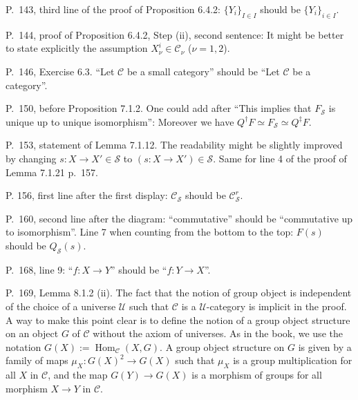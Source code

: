 \documentclass[12pt]{article}
\theoremstyle{remark}
\theoremstyle{definition}
\newcommand{\cc}{\mathcal}
\newcommand{\C}{\mathcal C}
\newcommand{\SSS}{\mathcal S}
\newcommand{\U}{\mathcal U}
\DeclareMathOperator{\Hom}{Hom}%
\begin{document}
\noindent P.~143, third line of the proof of Proposition 6.4.2: $\{Y_i\}_{I\in I}$ should be $\{Y_i\}_{i\in I}$. 

\noindent P.~144, proof of Proposition 6.4.2, Step (ii), second sentence: It might be better to state explicitly the assumption $X_\nu^i\in\C_\nu$ ($\nu=1,2$). 

\noindent P.~146, Exercise 6.3. ``Let $\C$ be a small category'' should be ``Let $\C$ be a category''. 

\noindent P.~150, before Proposition 7.1.2. One could add after ``This implies that $F_{\SSS}$ is unique up to unique isomorphism'': Moreover we have $Q^\dagger F\simeq F_{\SSS}\simeq Q^\ddagger F$. 

\noindent P.~153, statement of Lemma 7.1.12. The readability might be slightly improved by changing $s:X\to X'\in\mathcal S$ to $(s:X\to X')\in\mathcal S$. Same for line 4 of the proof of Lemma 7.1.21 p.~157.

\noindent P. 156, first line after the first display: $\C_{\cc S}$ should be $\C_{\cc S}^r$. 

\noindent P.~160, second line after the diagram: ``commutative'' should be ``commutative up to isomorphism''. Line 7 when counting from the bottom to the top: $F(s)$ should be $Q_{\mathcal S}(s)$. 

\noindent P.~168, line 9: ``$f:X\to Y$'' should be ``$f:Y\to X$''. 

\noindent P.~169, Lemma 8.1.2 (ii). The fact that the notion of group object is independent of the choice of a universe $\U$ such that $\C$ is a $\U$-category is implicit in the proof. A way to make this point clear is to define the notion of a group object structure on an object $G$ of $\C$ without the axiom of universes. As in the book, we use the notation $G(X):=\Hom_\C(X,G)$. A group object structure on $G$ is given by a family of maps $\mu_X:G(X)^2\to G(X)$ such that $\mu_X$ is a group multiplication for all $X$ in $\C$, and the map $G(Y)\to G(X)$ is a morphism of groups for all morphism $X\to Y$ in $\C$. 

\end{document}
